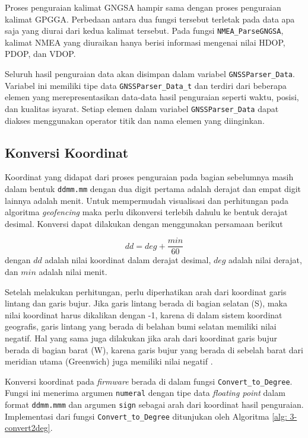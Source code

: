 Proses penguraian kalimat GNGSA hampir sama dengan proses penguraian kalimat GPGGA. Perbedaan antara dua fungsi tersebut terletak pada data apa saja yang diurai dari kedua kalimat tersebut. Pada fungsi \texttt{NMEA\_ParseGNGSA}, kalimat NMEA yang diuraikan hanya berisi informasi mengenai nilai HDOP, PDOP, dan VDOP.

Seluruh hasil penguraian data akan disimpan dalam variabel \texttt{GNSSParser\_Data}. Variabel ini memiliki tipe data \texttt{GNSSParser\_Data\_t} dan terdiri dari beberapa elemen yang merepresentasikan data-data hasil penguraian seperti waktu, posisi, dan kualitas isyarat. Setiap elemen dalam variabel \texttt{GNSSParser\_Data} dapat diakses menggunakan operator titik dan nama elemen yang diinginkan.

\subsection{Konversi Koordinat}
Koordinat yang didapat dari proses penguraian pada bagian sebelumnya masih dalam bentuk \texttt{ddmm.mm} dengan dua digit pertama adalah derajat dan empat digit lainnya adalah menit. Untuk mempermudah visualisasi dan perhitungan pada algoritma \textit{geofencing} maka perlu dikonversi terlebih dahulu ke bentuk derajat desimal. Konversi dapat dilakukan dengan menggunakan persamaan berikut

\begin{equation}
	dd = deg + \frac{min}{60} 
\end{equation}
dengan $dd$ adalah nilai koordinat dalam derajat desimal, $deg$ adalah nilai derajat, dan $min$ adalah nilai menit.

Setelah melakukan perhitungan, perlu diperhatikan arah dari koordinat garis lintang dan garis bujur. Jika garis lintang berada di bagian selatan (S), maka nilai koordinat harus dikalikan dengan -1, karena di dalam sistem koordinat geografis, garis lintang yang berada di belahan bumi selatan memiliki nilai negatif. Hal yang sama juga dilakukan jika arah dari koordinat garis bujur berada di bagian barat (W), karena garis bujur yang berada di sebelah barat dari meridian utama (Greenwich) juga memiliki nilai negatif \cite{AlHindawi2012}.

Konversi koordinat pada \textit{firmware} berada di dalam fungsi \texttt{Convert\_to\_Degree}. Fungsi ini menerima argumen \texttt{numeral} dengan tipe data \textit{floating point} dalam format \texttt{ddmm.mmm} dan argumen \texttt{sign} sebagai arah dari koordinat hasil penguraian. Implementasi dari fungsi \texttt{Convert\_to\_Degree} ditunjukan oleh Algoritma \ref{alg: 3-convert2deg}.

